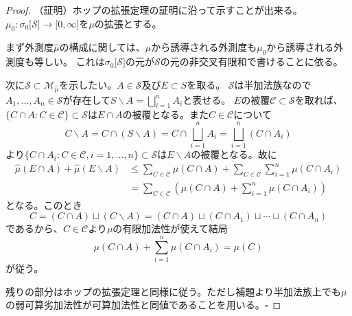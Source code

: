 \documentclass[../root.tex]{subfiles}
\begin{document}
\begin{proof}
（証明）ホップの拡張定理の証明に沿って示すことが出来る。$  \mu_{0}\colon\sigma_{0}\lbrack \mathscr{S} \rbrack\rightarrow\lbrack 0, \infty \rbrack $を$ \mu $の拡張とする。

まず外測度$ \widehat{\mu} $の構成に関しては、$ \mu $から誘導される外測度も$ \mu_{0} $から誘導される外測度も等しい。
これは$ \sigma_{0}\lbrack \mathscr{S} \rbrack $の元が$ \mathscr{S} $の元の非交叉有限和で書けることに依る。

次に$ \mathscr{S}\subset\mathscr{M}_{\widehat{\mu}} $を示したい。$ A\in\mathscr{S} $及び$ E\subset S $を取る。
$ \mathscr{S} $は半加法族なので$ A_{1}, \dotsc, A_{n}\in\mathscr{S} $が存在して$ S\backslash A=\bigsqcup_{i=1}^{n}A_{i} $と表せる。
$ E $の被覆$ \mathscr{C}\subset\mathscr{S} $を取れば、$ \lbrace C\cap A : C\in\mathscr{C} \rbrace\subset\mathscr{S} $は$ E\cap A $の被覆となる。また$ C\in\mathscr{C} $について
\[ C\backslash A=C\cap( S\backslash A )=C\cap\bigsqcup_{i=1}^{n}A_{i}=\bigsqcup_{i=1}^{n}( C\cap A_{i} ) \]
より$ \lbrace C\cap A_{i} : C\in\mathscr{C}, i=1, \dotsc, n \rbrace\subset\mathscr{S} $は$ E\backslash A $の被覆となる。故に
\begin{align*}
\widehat{\mu}( E\cap A )+\widehat{\mu}( E\backslash A ) &\le \sum_{C\in\mathscr{C}}\mu( C\cap A )+\sum_{C\in\mathscr{C}}\sum_{i=1}^{n}\mu( C\cap A_{i} ) \\
&=\sum_{C\in\mathscr{C}}\left( \mu( C\cap A )+\sum_{i=1}^{n}\mu( C\cap A_{i} ) \right)
\end{align*}
となる。このとき
\[ C=( C\cap A )\sqcup ( C\backslash A )=( C\cap A )\sqcup( C\cap A_{1} )\sqcup\dotsb\sqcup( C\cap A_{n} ) \]
であるから、$ C\in\mathscr{C} $より$ \mu $の有限加法性が使えて結局
\[ \mu( C\cap A )+\sum_{i=1}^{n}\mu( C\cap A_{i} )=\mu( C ) \]
が従う。

残りの部分はホップの拡張定理と同様に従う。ただし補題より半加法族上でも$ \mu $の弱可算劣加法性が可算加法性と同値であることを用いる。$ \square $
\end{proof}
\end{document}
